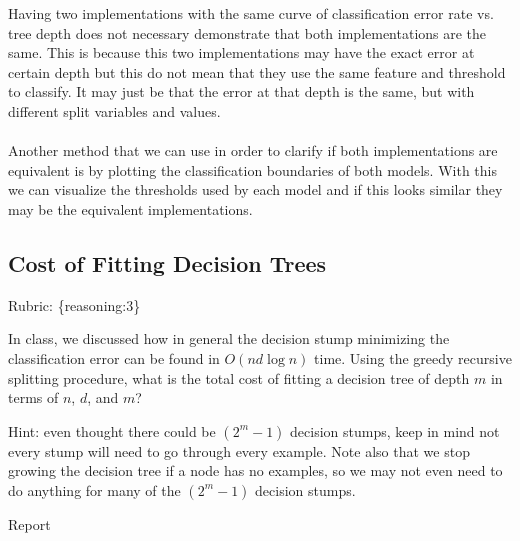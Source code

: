 \documentclass{article}
\def\rubric#1{\gre{Rubric: \{#1\}}}{}
\def\blu#1{{\color{blu}#1}}
\def\gre#1{{\color{gre}#1}}
\def\ans#1{{\color{ans}#1}}
\begin{document}
\ans{
    Having two implementations with the same curve of classification error rate vs. tree depth does not 
    necessary demonstrate that both implementations are the same. This is because this two implementations
    may have the exact error at certain depth but this do not mean that they use the same feature and
    threshold to classify. It may just be that the error at that depth is the same, but with 
    different split variables and values.
    \\ \\
    Another method that we can use in order to clarify if both implementations are equivalent is 
    by plotting the classification boundaries of both models. With this we can visualize the 
    thresholds used by each model and if this looks similar they may be the equivalent implementations.
}

\subsection{Cost of Fitting Decision Trees}
\rubric{reasoning:3}

In class, we discussed how in general the decision stump minimizing the classification error can be found in $O(nd\log n)$ time.
Using the greedy recursive splitting procedure, \blu{what is the total cost of fitting a decision tree of depth $m$ in terms of $n$, $d$, and $m$?}

Hint: even thought there could be $(2^m-1)$ decision stumps, keep in mind not every stump will need to go through every example. Note also that we stop growing the decision tree if a node has no examples, so we may not even need to do anything for many of the $(2^m-1)$ decision stumps.

\ans{
    Report
}
\end{document}
